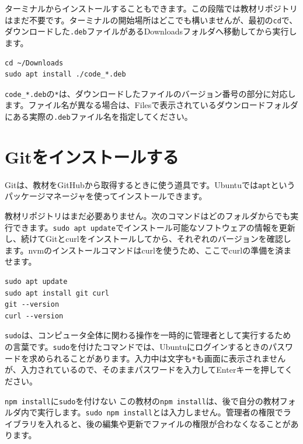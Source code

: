 ターミナルからインストールすることもできます。この段階では教材リポジトリはまだ不要です。ターミナルの開始場所はどこでも構いませんが、最初の\texttt{cd}で、ダウンロードした\texttt{.deb}ファイルがあるDownloadsフォルダへ移動してから実行します。

\begin{listing}[htbp]
\begin{verbatim}
cd ~/Downloads
sudo apt install ./code_*.deb
\end{verbatim}
\caption{DownloadsフォルダのVS Code用\texttt{.deb}ファイルをインストールするコマンド}
\label{lst:appendix-ubuntu-install-vscode}
\end{listing}

\texttt{code\_*.deb}の\texttt{*}は、ダウンロードしたファイルのバージョン番号の部分に対応します。ファイル名が異なる場合は、Filesで表示されているダウンロードフォルダにある実際の\texttt{.deb}ファイル名を指定してください。

\section{Gitをインストールする}

Gitは、教材をGitHubから取得するときに使う道具です。Ubuntuでは\texttt{apt}というパッケージマネージャを使ってインストールできます。

教材リポジトリはまだ必要ありません。次のコマンドはどのフォルダからでも実行できます。\texttt{sudo apt update}でインストール可能なソフトウェアの情報を更新し、続けてGitとcurlをインストールしてから、それぞれのバージョンを確認します。nvmのインストールコマンドはcurlを使うため、ここでcurlの準備を済ませます。

\begin{listing}[htbp]
\begin{verbatim}
sudo apt update
sudo apt install git curl
git --version
curl --version
\end{verbatim}
\caption{Gitとcurlをインストールしてバージョンを確認するコマンド}
\label{lst:appendix-ubuntu-install-git}
\end{listing}

\texttt{sudo}は、コンピュータ全体に関わる操作を一時的に管理者として実行するための言葉です。\texttt{sudo}を付けたコマンドでは、Ubuntuにログインするときのパスワードを求められることがあります。入力中は文字も\texttt{*}も画面に表示されませんが、入力されているので、そのままパスワードを入力してEnterキーを押してください。

\begin{notebox}{\texttt{npm install}に\texttt{sudo}を付けない}
この教材の\texttt{npm install}は、後で自分の教材フォルダ内で実行します。\texttt{sudo npm install}とは入力しません。管理者の権限でライブラリを入れると、後の編集や更新でファイルの権限が合わなくなることがあります。
\end{notebox}

